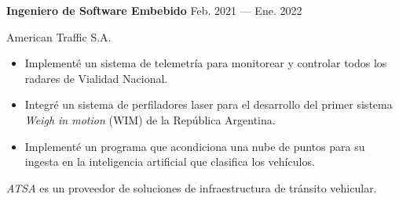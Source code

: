 \bigskip
\parbox[t][][t]{\linewidth}{
	\parbox{\linewidth}{
		\textbf{Ingeniero de Software Embebido}
			\hfill
			{Feb. 2021 --- Ene. 2022}
		}
	\smallbreak
	\parbox{\linewidth}{American Traffic S.A.}
	\smallbreak
	\begin{itemize}
	    \item{Implementé un sistema de telemetría para monitorear y controlar todos los radares de Vialidad Nacional.}
	    \item{Integré un sistema de perfiladores laser para el desarrollo del primer sistema \emph{Weigh in motion} (WIM) de la República Argentina.}
		\item{Implementé un programa que acondiciona una nube de puntos para su ingesta en la inteligencia artificial que clasifica los vehículos.}
	\end{itemize}
	\smallbreak
    \emph{ATSA} es un proveedor de soluciones de infraestructura de tránsito vehicular.
}

\bigskip
%


